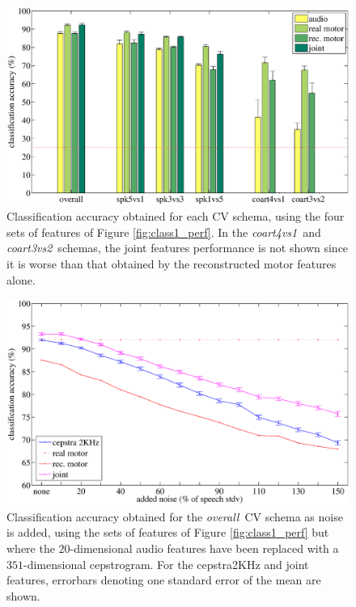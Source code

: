 \documentclass{pnastwo}
\newcommand{\overall}{\emph{overall}}
\newcommand{\coa}{\emph{coart4vs1}}
\newcommand{\cob}{\emph{coart3vs2}}
\begin{document}
\begin{figure}[t]
  \centerline{\includegraphics[width=.5\textwidth]{figs/figClass2}}
  \caption{Classification accuracy obtained for each CV schema, using the
    four sets of features of Figure \ref{fig:class1_perf}. In the \coa\ and
    \cob\ schemas, the joint features performance is not shown since it is
    worse than that obtained by the reconstructed motor features alone.}
  \label{fig:class2_perf}
\end{figure}

\begin{figure}[t]
  \centerline{\includegraphics[width=.5\textwidth]{figs/figClass3}}
  \caption{Classification accuracy obtained for the \overall\ CV schema
    as noise is added, using the sets of features of Figure \ref{fig:class1_perf}
    but where the $20$-dimensional audio features have been replaced with a
    $351$-dimensional cepstrogram. For the cepstra2KHz and joint features,
    errorbars denoting one standard error of the mean are shown.}
  \label{fig:class3_perf}
\end{figure}
\end{document}
